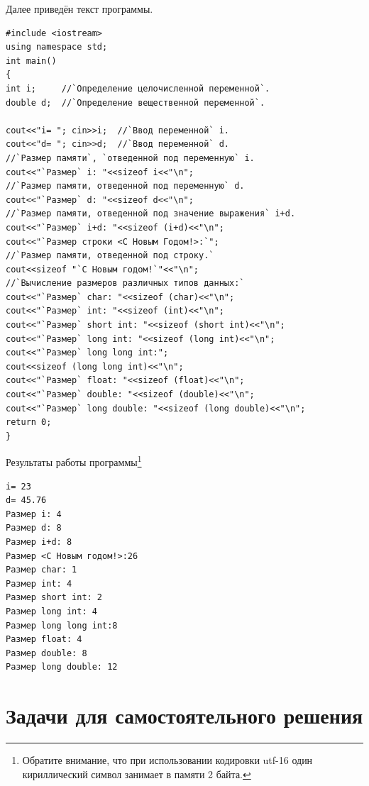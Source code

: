 Далее приведён текст программы.
\begin{lstlisting}
#include <iostream>
using namespace std;
int main()
{
int i;     //`Определение целочисленной переменной`.
double d;  //`Определение вещественной переменной`.

cout<<"i= "; cin>>i;  //`Ввод переменной` i.
cout<<"d= "; cin>>d;  //`Ввод переменной` d.
//`Размер памяти`, `отведенной под переменную` i.
cout<<"`Размер` i: "<<sizeof i<<"\n";
//`Размер памяти, отведенной под переменную` d.
cout<<"`Размер` d: "<<sizeof d<<"\n";
//`Размер памяти, отведенной под значение выражения` i+d.
cout<<"`Размер` i+d: "<<sizeof (i+d)<<"\n";
cout<<"`Размер строки <С Новым Годом!>:`";
//`Размер памяти, отведенной под строку.`
cout<<sizeof "`С Новым годом!`"<<"\n";
//`Вычисление размеров различных типов данных:`
cout<<"`Размер` char: "<<sizeof (char)<<"\n";
cout<<"`Размер` int: "<<sizeof (int)<<"\n";
cout<<"`Размер` short int: "<<sizeof (short int)<<"\n";
cout<<"`Размер` long int: "<<sizeof (long int)<<"\n";
cout<<"`Размер` long long int:";
cout<<sizeof (long long int)<<"\n";
cout<<"`Размер` float: "<<sizeof (float)<<"\n";
cout<<"`Размер` double: "<<sizeof (double)<<"\n";
cout<<"`Размер` long double: "<<sizeof (long double)<<"\n";
return 0;
}
\end{lstlisting}

Результаты работы программы\footnote{Обратите внимание, что при использовании кодировки utf-16 один кириллический символ
занимает в памяти 2 байта.}

\begin{verbatim}
i= 23 
d= 45.76 
Размер i: 4 
Размер d: 8 
Размер i+d: 8 
Размер <С Новым годом!>:26 
Размер char: 1 
Размер int: 4 
Размер short int: 2 
Размер long int: 4 
Размер long long int:8 
Размер float: 4 
Размер double: 8 
Размер long double: 12 
\end{verbatim}

\section[Задачи для самостоятельного решения]{Задачи для самостоятельного решения}
